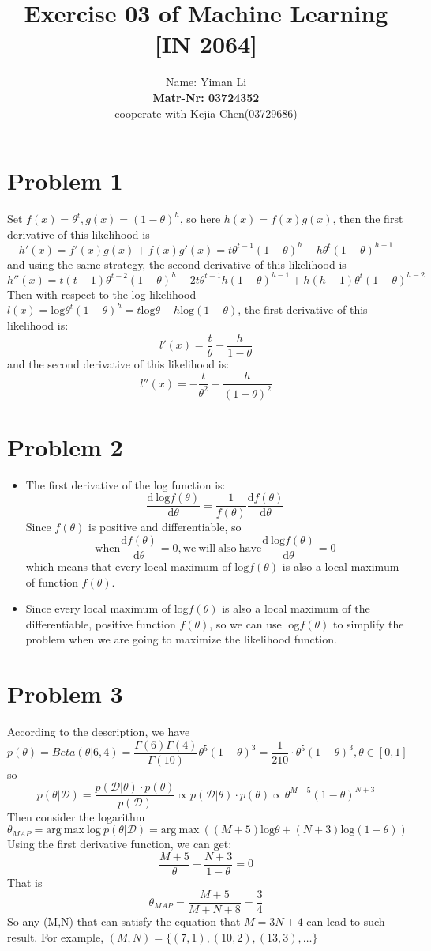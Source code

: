 \documentclass{article}
\title{Exercise 03 of Machine Learning [IN 2064]}
\author{
  Name: Yiman Li \\
  \textbf{Matr-Nr: 03724352} \\
  cooperate with Kejia Chen(03729686)\\
}
\begin{document}
\maketitle

\section*{Problem 1}
Set $f(x) = \theta^t, g(x) = (1-\theta)^h$, so here $h(x) = f(x)g(x) $, then the first derivative of this likelihood is
\[ h'(x) = f'(x)g(x) + f(x)g'(x) = t\theta^{t-1}(1-\theta)^h -h\theta^t(1-\theta)^{h-1}\]
and using the same strategy, the second derivative of this likelihood is
\[ h''(x) = t(t-1)\theta^{t-2}(1-\theta)^h - 2t\theta^{t-1}h(1-\theta)^{h-1} + h(h-1)\theta^t(1-\theta)^{h-2}\]
Then with respect to the log-likelihood $l(x) = \mathrm{log}\theta^t(1-\theta)^h = t\mathrm{log}\theta + h\mathrm{log}(1-\theta)$, the first derivative of this likelihood is:
\[ l'(x) = \frac{t}{\theta} -\frac{h}{1-\theta}\]
and the second derivative of this likelihood is:
\[ l''(x) = -\frac{t}{\theta^2} - \frac{h}{(1-\theta)^2}\]
\section*{Problem 2}
\begin{itemize}
	\item The first derivative of the log function is:
	\[ \frac{\mathrm{d\ log}f(\theta)}{\mathrm{d}\theta} = \frac{1}{f(\theta)}\frac{\mathrm{d}f(\theta)}{\mathrm{d}\theta}\]
	Since $f(\theta)$ is positive and differentiable, so
	\[\mathrm{when} \frac{\mathrm{d}f(\theta)}{\mathrm{d}\theta} =0,\mathrm{we\ will\ also\ have} \frac{\mathrm{d\ log}f(\theta)}{\mathrm{d}\theta}=0\]
	which means that every local maximum of $\mathrm{log} f(\theta)$ is also a local maximum of function $f(\theta)$.
	\item Since every local maximum of log$f(\theta)$ is also a local maximum of the differentiable, positive function $f(\theta)$, so we can use log$f(\theta)$ to simplify the problem when we are going to maximize the likelihood function.
\end{itemize}


\section*{Problem 3}
According to the description, we have
\[ p(\theta) = Beta(\theta|6,4) = \frac{\varGamma(6)\varGamma(4)}{\varGamma(10)}\theta^5(1-\theta)^3 = \frac{1}{210}\cdot \theta^5(1-\theta)^3, \theta \in [0,1] \]
so
\[ p(\theta|\mathcal{D}) = \frac{p(\mathcal{D}|\theta) \cdot p(\theta)}{p(\mathcal{D})} \propto p(\mathcal{D}|\theta) \cdot p(\theta) \propto \theta^{M+5}(1-\theta)^{N+3} \]
Then consider the logarithm
\[ \theta_{MAP} = \mathrm{arg\ max\ log}\ p(\theta|\mathcal{D}) = \mathrm{arg\ max}\ ((M+5)\mathrm{log}\theta + (N+3)\mathrm{log}(1-\theta)) \]
Using the first derivative function, we can get:
\[ \frac{M+5}{\theta} - \frac{N+3}{1-\theta} = 0\]
That is
\[ \theta_{MAP} = \frac{M+5}{M+N+8} = \frac{3}{4}\]
So any (M,N) that can satisfy the equation that $M=3N+4$ can lead to such result. For example, $(M,N) = \{(7,1),(10,2),(13,3),\dots\} $
\end{document}
